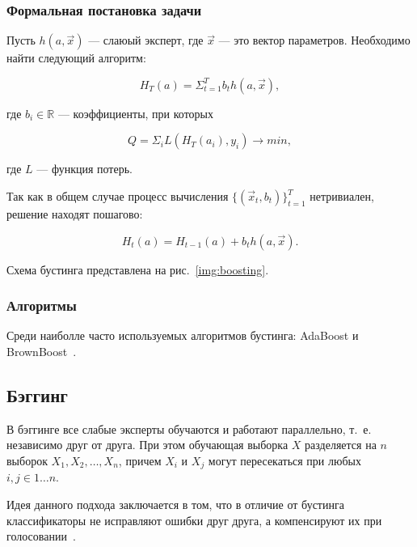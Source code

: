 \subsubsection*{Формальная постановка задачи}

Пусть $h(a, \overrightarrow{x})$ --- слаюый эксперт, где $\overrightarrow{x}$ --- это вектор параметров. Необходимо найти следующий алгоритм:

\begin{equation}
H_T(a) = \Sigma_{t=1}^T b_th(a, \overrightarrow{x}),
\end{equation}

где $b_i \in \mathbb{R}$ --- коэффициенты, при которых

\begin{equation}
Q = \Sigma_iL(H_T(a_i), y_i) \to min,
\end{equation}

где $L$ --- функция потерь. 

Так как в общем случае процесс вычисления $\{(\overrightarrow{x}_t, b_t)\}_{t=1}^T$ нетривиален, решение находят пошагово:

\begin{equation}
H_t(a) = H_{t-1}(a) + b_th(a, \overrightarrow{x}).
\end{equation}

Схема бустинга представлена на рис.~\ref{img:boosting}.


\subsubsection*{Алгоритмы}

Среди наиболле часто используемых алгоритмов бустинга: AdaBoost и BrownBoost~\cite{ensembles}.

\subsection{Бэггинг}

В бэггинге все слабые эксперты обучаются и работают параллельно, т.~е. независимо друг от друга. При этом обучающая выборка $X$ разделяется на $n$ выборок $X_1, X_2, \dots, X_n$, причем $X_i$ и $X_j$ могут пересекаться при любых $i,j \in 1 \dots n$.

Идея данного подхода заключается в том, что в отличие от бустинга классификаторы не исправляют ошибки друг друга, а компенсируют их при голосовании~\cite{ensembles}. 

